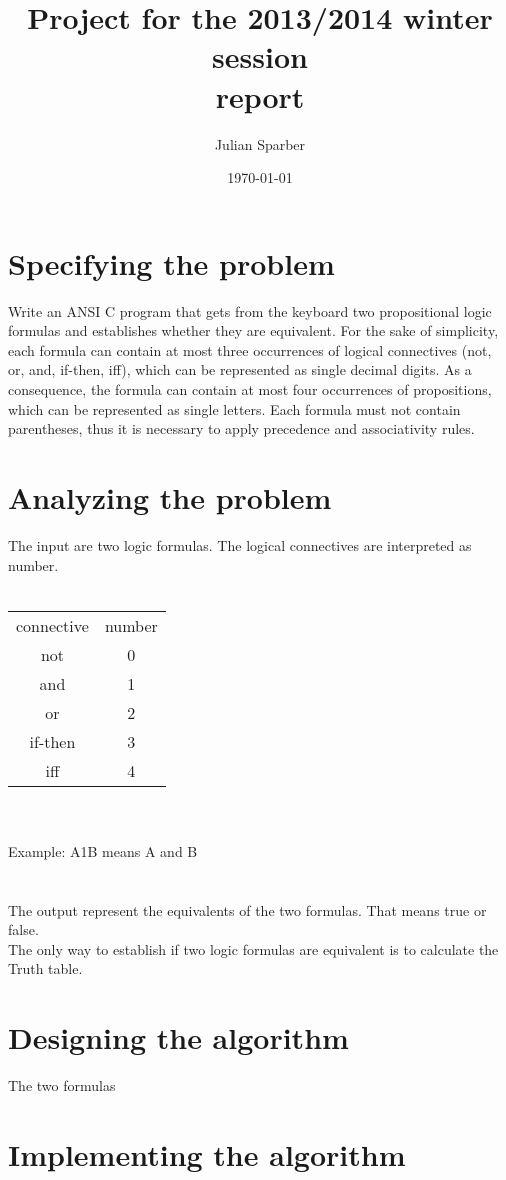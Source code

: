 \documentclass[11pt, a4paper, titlepage, block]{article}
\title{\textbf{Project for the 2013/2014 winter session\\ report}}
\author{Julian Sparber}
\date{\today}
\begin{document}
\maketitle
\section{Specifying the problem}
	Write an ANSI C program that gets from the keyboard two propositional logic formulas and
	establishes whether they are equivalent. For the sake of simplicity, each formula can contain at
	most three occurrences of logical connectives (not, or, and, if-then, iff), which can be represented
	as single decimal digits. As a consequence, the formula can contain at most four occurrences of
	propositions, which can be represented as single letters. Each formula must not contain parentheses,
	thus it is necessary to apply precedence and associativity rules.
	\newpage
\section{Analyzing the problem}
	The input are two logic formulas. The logical connectives are interpreted as number. \\
	\\
	\begin{tabular}{cc}
	connective & number\\
		not & 0\\
		and & 1\\
		or & 2\\
		if-then & 3\\
		iff & 4\\
	\end{tabular}\\
	\\
	Example: A1B means A and B\\
	\\ 
	\\
	The output represent the equivalents of the two formulas. That means true or false.\\
	The only way to establish if two logic formulas are equivalent is to calculate the Truth table.
	\newpage			
\section{Designing the algorithm}
	The two formulas
	\newpage
\section{Implementing the algorithm}
\end{document}
